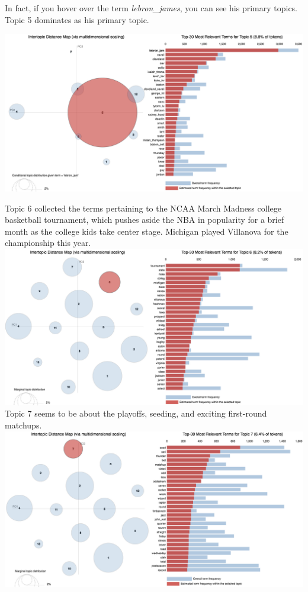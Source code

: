 \documentclass[11pt]{article}
\begin{document}
In fact, if you hover over the term \textit{lebron\_james}, you can see his primary topics. Topic 5 dominates as his primary topic. 

\includegraphics[width=470pt]{6_lebron.png} 


Topic 6 collected the terms pertaining to the NCAA March Madness college basketball tournament, which pushes aside the NBA in popularity for a brief month as the college kids take center stage. Michigan played Villanova for the championship this year. \\
\includegraphics[width=470pt]{6.png} \\

Topic 7 seems to be about the playoffs, seeding, and exciting first-round matchups.  \\
\includegraphics[width=470pt]{7.png} \\
\end{document}
